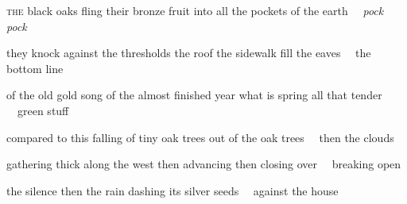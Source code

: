 
\begin{poem}
\begin{stanza}
\textsc{the} black oaks\verseline
fling their bronze fruit\verseline
into all the pockets of the earth\verseline
~~\textit{pock pock}
\end{stanza}

\begin{stanza}
they knock against the thresholds\verseline
the roof the sidewalk\verseline
fill the eaves\verseline
~~the bottom line
\end{stanza}

\begin{stanza}
of the old gold song\verseline
of the almost finished year\verseline
what is spring all that tender\verseline
~~green stuff
\end{stanza}

\begin{stanza}
compared to this\verseline
falling of tiny oak trees\verseline
out of the oak trees\verseline
~~then the clouds
\end{stanza}

\begin{stanza}
gathering thick along the west\verseline
then advancing\verseline
then closing over\verseline
~~breaking open
\end{stanza}

\begin{stanza}
the silence\verseline
then the rain\verseline
dashing its silver seeds\verseline
~~against the house
\end{stanza}
\end{poem}
